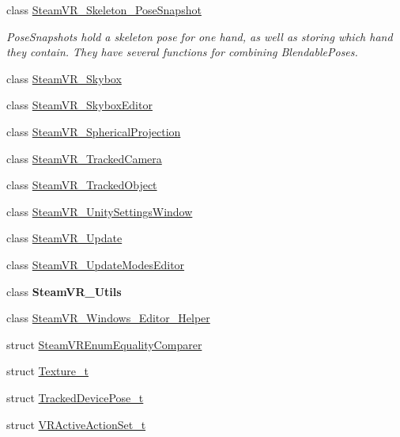 \begin{DoxyCompactItemize}
\item 
class \mbox{\hyperlink{class_valve_1_1_v_r_1_1_steam_v_r___skeleton___pose_snapshot}{Steam\+V\+R\+\_\+\+Skeleton\+\_\+\+Pose\+Snapshot}}
\begin{DoxyCompactList}\small\item\em Pose\+Snapshots hold a skeleton pose for one hand, as well as storing which hand they contain. They have several functions for combining Blendable\+Poses. \end{DoxyCompactList}\item 
class \mbox{\hyperlink{class_valve_1_1_v_r_1_1_steam_v_r___skybox}{Steam\+V\+R\+\_\+\+Skybox}}
\item 
class \mbox{\hyperlink{class_valve_1_1_v_r_1_1_steam_v_r___skybox_editor}{Steam\+V\+R\+\_\+\+Skybox\+Editor}}
\item 
class \mbox{\hyperlink{class_valve_1_1_v_r_1_1_steam_v_r___spherical_projection}{Steam\+V\+R\+\_\+\+Spherical\+Projection}}
\item 
class \mbox{\hyperlink{class_valve_1_1_v_r_1_1_steam_v_r___tracked_camera}{Steam\+V\+R\+\_\+\+Tracked\+Camera}}
\item 
class \mbox{\hyperlink{class_valve_1_1_v_r_1_1_steam_v_r___tracked_object}{Steam\+V\+R\+\_\+\+Tracked\+Object}}
\item 
class \mbox{\hyperlink{class_valve_1_1_v_r_1_1_steam_v_r___unity_settings_window}{Steam\+V\+R\+\_\+\+Unity\+Settings\+Window}}
\item 
class \mbox{\hyperlink{class_valve_1_1_v_r_1_1_steam_v_r___update}{Steam\+V\+R\+\_\+\+Update}}
\item 
class \mbox{\hyperlink{class_valve_1_1_v_r_1_1_steam_v_r___update_modes_editor}{Steam\+V\+R\+\_\+\+Update\+Modes\+Editor}}
\item 
class {\bfseries Steam\+V\+R\+\_\+\+Utils}
\item 
class \mbox{\hyperlink{class_valve_1_1_v_r_1_1_steam_v_r___windows___editor___helper}{Steam\+V\+R\+\_\+\+Windows\+\_\+\+Editor\+\_\+\+Helper}}
\item 
struct \mbox{\hyperlink{struct_valve_1_1_v_r_1_1_steam_v_r_enum_equality_comparer}{Steam\+V\+R\+Enum\+Equality\+Comparer}}
\item 
struct \mbox{\hyperlink{struct_valve_1_1_v_r_1_1_texture__t}{Texture\+\_\+t}}
\item 
struct \mbox{\hyperlink{struct_valve_1_1_v_r_1_1_tracked_device_pose__t}{Tracked\+Device\+Pose\+\_\+t}}
\item 
struct \mbox{\hyperlink{struct_valve_1_1_v_r_1_1_v_r_active_action_set__t}{V\+R\+Active\+Action\+Set\+\_\+t}}

\end{DoxyCompactItemize}
